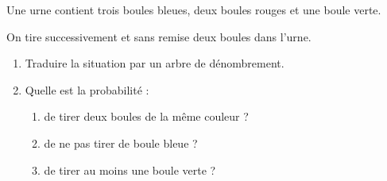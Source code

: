\begin{exo}
	Une urne contient trois boules bleues, deux boules rouges et une boule verte.

	On tire successivement et sans remise deux boules dans l'urne.

	\begin{enumerate}
		\item Traduire la situation par un arbre de dénombrement.
		\item Quelle est la probabilité :
		      \begin{enumerate}
			      \item de tirer deux boules de la même couleur ?
			      \item de ne pas tirer de boule bleue ?
			      \item de tirer au moins une boule verte ?
		      \end{enumerate}
	\end{enumerate}
\end{exo}
